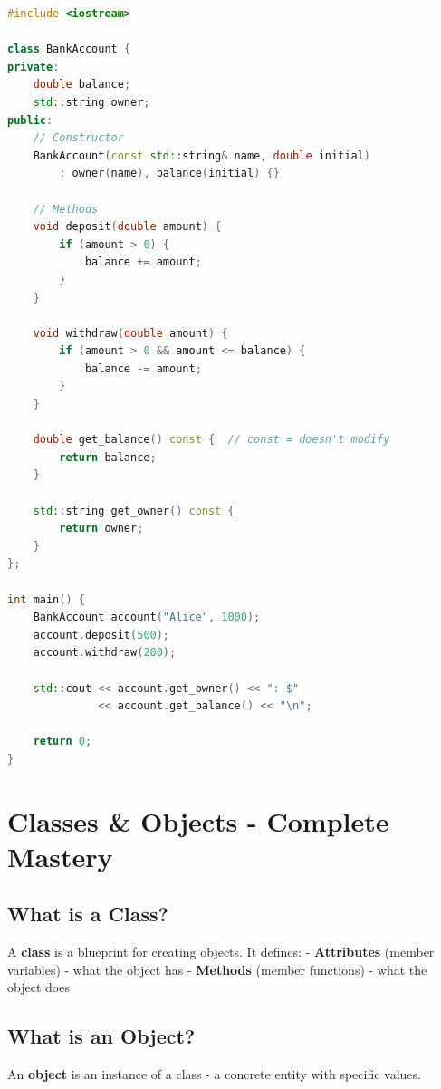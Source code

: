\begin{lstlisting}[language={C++}]
#include <iostream>

class BankAccount {
private:
    double balance;
    std::string owner;
public:
    // Constructor
    BankAccount(const std::string& name, double initial) 
        : owner(name), balance(initial) {}
    
    // Methods
    void deposit(double amount) {
        if (amount > 0) {
            balance += amount;
        }
    }
    
    void withdraw(double amount) {
        if (amount > 0 && amount <= balance) {
            balance -= amount;
        }
    }
    
    double get_balance() const {  // const = doesn't modify
        return balance;
    }
    
    std::string get_owner() const {
        return owner;
    }
};

int main() {
    BankAccount account("Alice", 1000);
    account.deposit(500);
    account.withdraw(200);
    
    std::cout << account.get_owner() << ": $" 
              << account.get_balance() << "\n";
    
    return 0;
}
\end{lstlisting}

\hypertarget{classes-objects---complete-mastery}{%
\section{Classes \& Objects - Complete
Mastery}\label{classes-objects---complete-mastery}}

\hypertarget{what-is-a-class}{%
\subsection{What is a Class?}\label{what-is-a-class}}

A \textbf{class} is a blueprint for creating objects. It defines: -
\textbf{Attributes} (member variables) - what the object has -
\textbf{Methods} (member functions) - what the object does

\hypertarget{what-is-an-object}{%
\subsection{What is an Object?}\label{what-is-an-object}}

An \textbf{object} is an instance of a class - a concrete entity with
specific values.


